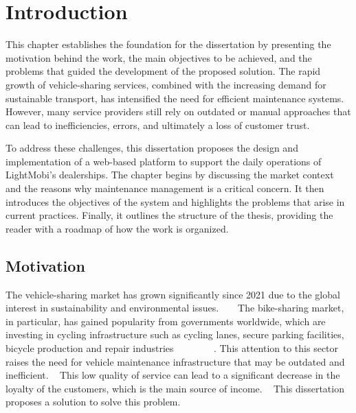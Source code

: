 \chapter{Introduction}%
\label{chapter:introduction}

\begin{introduction}
This chapter establishes the foundation for the dissertation by presenting the motivation behind the work, the main objectives to be achieved, and the problems that guided the development of the proposed solution. The rapid growth of vehicle-sharing services, combined with the increasing demand for sustainable transport, has intensified the need for efficient maintenance systems. However, many service providers still rely on outdated or manual approaches that can lead to inefficiencies, errors, and ultimately a loss of customer trust.

To address these challenges, this dissertation proposes the design and implementation of a web-based platform to support the daily operations of LightMobi's dealerships. The chapter begins by discussing the market context and the reasons why maintenance management is a critical concern. It then introduces the objectives of the system and highlights the problems that arise in current practices. Finally, it outlines the structure of the thesis, providing the reader with a roadmap of how the work is organized.

\end{introduction} 


\section{Motivation}

The vehicle-sharing market has grown significantly since 2021 due to the global interest in sustainability and environmental issues. ~\cite{cohesionOpenData} ~\cite{bike_data_businessresearch}
The bike-sharing market, in particular, has gained popularity from governments worldwide, which are investing in cycling infrastructure such as cycling lanes, secure parking facilities, bicycle production and repair industries ~\cite{Clercq2023} ~\cite{Cerro2024} ~\cite{European_declararion_on_cycling} ~\cite{bike_data_businessresearch} ~\cite{cohesionOpenData}.
This attention to this sector raises the need for vehicle maintenance infrastructure that may be outdated and inefficient. ~\cite{MAS_MOTORS}
This low quality of service can lead to a significant decrease in the loyalty of the customers, which is the main source of income. ~\cite{Setting_the_after_sale_process}
This dissertation proposes a solution to solve this problem.

